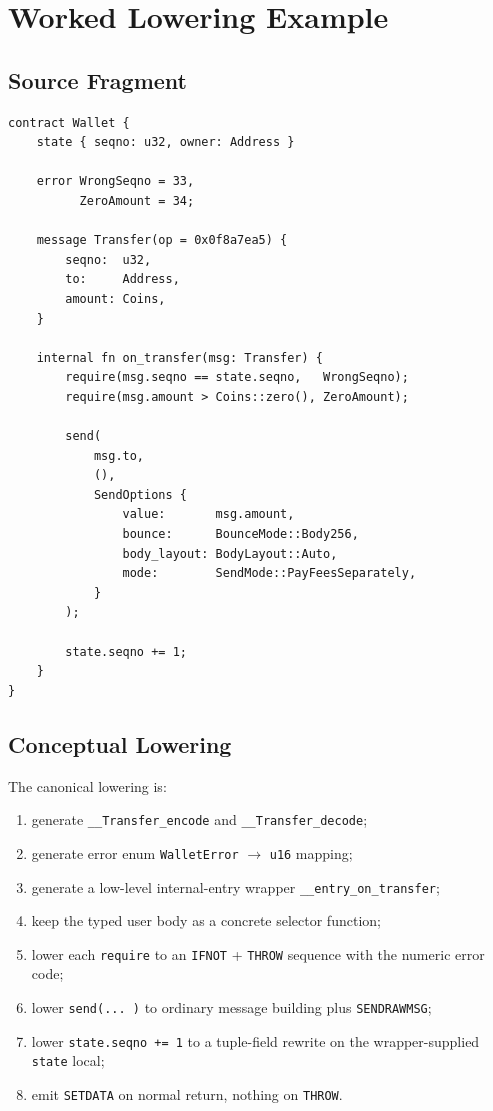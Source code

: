\documentclass[12pt,oneside]{article}
\begin{document}
\section{Worked Lowering Example}
\subsection{Source Fragment}
\begin{verbatim}
contract Wallet {
    state { seqno: u32, owner: Address }

    error WrongSeqno = 33,
          ZeroAmount = 34;

    message Transfer(op = 0x0f8a7ea5) {
        seqno:  u32,
        to:     Address,
        amount: Coins,
    }

    internal fn on_transfer(msg: Transfer) {
        require(msg.seqno == state.seqno,   WrongSeqno);
        require(msg.amount > Coins::zero(), ZeroAmount);

        send(
            msg.to,
            (),
            SendOptions {
                value:       msg.amount,
                bounce:      BounceMode::Body256,
                body_layout: BodyLayout::Auto,
                mode:        SendMode::PayFeesSeparately,
            }
        );

        state.seqno += 1;
    }
}
\end{verbatim}

\subsection{Conceptual Lowering}
The canonical lowering is:

\begin{enumerate}
\item generate \verb|__Transfer_encode| and \verb|__Transfer_decode|;
\item generate error enum \verb|WalletError| $\to$ \verb|u16| mapping;
\item generate a low-level internal-entry wrapper
\verb|__entry_on_transfer|;
\item keep the typed user body as a concrete selector function;
\item lower each \verb|require| to an \verb|IFNOT| + \verb|THROW|
sequence with the numeric error code;
\item lower \verb|send(... )| to ordinary message building plus
\verb|SENDRAWMSG|;
\item lower \verb|state.seqno += 1| to a tuple-field rewrite on the
wrapper-supplied \verb|state| local;
\item emit \verb|SETDATA| on normal return, nothing on \verb|THROW|.
\end{enumerate}
\end{document}
